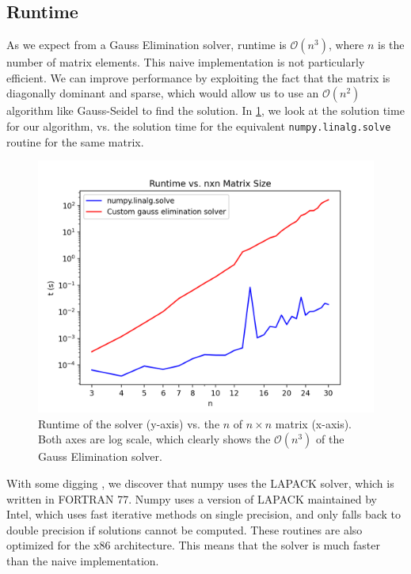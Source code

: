 \documentclass[10pt,letterpaper,notitlepage]{article}
\begin{document}
	\subsection{Runtime}
	As we expect from a Gauss Elimination solver, runtime is $\mathcal{O}(n^3)$, where $n$ is the number of matrix elements. This naive implementation is not particularly efficient. We can improve performance by exploiting the fact that the matrix is diagonally dominant and sparse, which would allow us to use an $\mathcal{O}(n^2)$ algorithm like Gauss-Seidel to find the solution.
	In \cref{fig:complexity}, we look at the solution time for our algorithm, vs. the solution time for the equivalent \texttt{numpy.linalg.solve} routine for the same matrix.
	\begin{figure}
		\includegraphics[width=0.9\linewidth]{runtime_vs_n.png}
		\caption[Runtime vs. Matrix Size]{Runtime of the solver (y-axis) vs. the $n$ of $n\times n$ matrix (x-axis). Both axes are log scale, which clearly shows the $\mathcal{O}(n^3)$ of the Gauss Elimination solver.}
		\label{fig:complexity}
	\end{figure}
	With some digging \cite{ali_mAnswerWhyDoes2015}, we discover that numpy uses the LAPACK solver, which is written in FORTRAN 77. Numpy uses a version of LAPACK maintained by Intel, which uses fast iterative methods on single precision, and only falls back to double precision if solutions cannot be computed. These routines are also optimized for the x86 architecture. This means that the solver is much faster than the naive implementation. \cite{Gesv}
	\printbibliography
\end{document}

